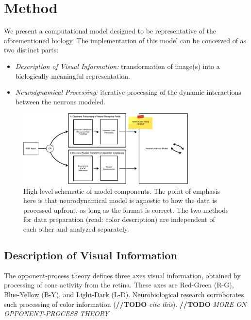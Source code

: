 \documentclass[journal,onecolumn]{IEEEtran}
\begin{document}
%
%
%
\section{Method}

We present a computational model designed to be representative of the aforementioned biology. The implementation of this model can be conceived of as two distinct parts:
\begin{itemize}
    \item \textit{Description of Visual Information:} transformation of image(s) into a biologically meaningful representation.
    \item \textit{Neurodynamical Processing:} iterative processing of the dynamic interactions between the neurons modeled.
\end{itemize}

\begin{figure}[H]
    \centering
    \includegraphics[width=0.8\textwidth]{model1_mockup}
    \caption{High level schematic of model components. The point of emphasis here is that neurodynamical model is agnostic to how the data is processed upfront, as long as the format is correct. The two methods for data preparation (read: color description) are independent of each other and analyzed separately.}
    \label{fig:model-parts}
\end{figure}

\subsection*{Description of Visual Information}

The opponent-process theory defines three axes visual information, obtained by processing of cone activity from the retina. These axes are Red-Green (R-G), Blue-Yellow (B-Y), and Light-Dark (L-D). Neurobiological research corroborates such processing of color information (\textbf{//TODO} \textit{cite this}). \textbf{//TODO} \textit{MORE ON OPPONENT-PROCESS THEORY}
\end{document}
